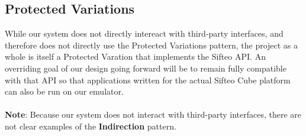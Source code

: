 \documentclass[12pt]{article}
\begin{document}
\subsection{Protected Variations}
While our system does not directly intereact with third-party interfaces, and therefore does not directly use the Protected Variations pattern, the project as a whole is itself a Protected Varation that implements the Sifteo API. An overriding goal of our design going forward will be to remain fully compatible with that API so that applications written for the actual Sifteo Cube platform can also be run on our emulator.
\\\\
\textbf{Note}: Because our system does not interact with third-party interfaces, there are not clear examples of the \textbf{Indirection} pattern.
        
\end{document}
